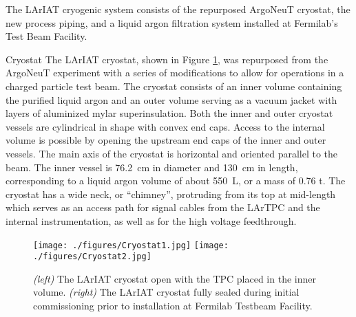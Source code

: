 The LArIAT cryogenic system consists of the repurposed ArgoNeuT cryostat, the new process piping, and a liquid argon filtration system installed at Fermilab's Test Beam Facility.

\begin{subsubsection}{Cryostat}
The LArIAT cryostat, shown in Figure \ref{fig:LArIATCryoStat}, was repurposed from the ArgoNeuT experiment with a series of modifications to allow for operations in a charged particle test beam. The cryostat \cite{ArgoNeuT} consists of an inner volume containing the purified liquid argon and an outer volume serving as a vacuum jacket with layers of aluminized mylar superinsulation. Both the inner and outer cryostat vessels are cylindrical in shape with convex end caps.  Access to the internal volume is possible by opening the upstream end caps of the inner and outer vessels. The main axis of the cryostat is horizontal and oriented parallel to the beam. The inner vessel is 76.2~cm in diameter and 130~cm in length, corresponding to a liquid argon volume of about 550~L, or a mass of 0.76 t. The cryostat has a wide neck, or ``chimney'', protruding from its top at mid-length which serves as an access path for signal cables from the LArTPC and the internal instrumentation, as well as for the high voltage feedthrough. 

\begin{figure}[htb]
\centering
\texttt{[image: ./figures/Cryostat1.jpg]}
\texttt{[image: ./figures/Cryostat2.jpg]}
\caption{\emph{(left)} The LArIAT cryostat open with the TPC placed in the inner volume. \emph{(right)} The LArIAT cryostat fully sealed during initial commissioning prior to installation at Fermilab Testbeam Facility.}
\label{fig:LArIATCryoStat}
\end{figure}


\end{subsubsection}
